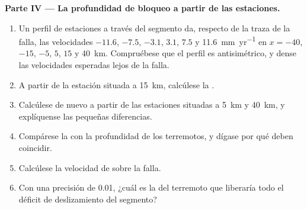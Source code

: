 \begin{problem}
\medskip
\noindent\textbf{Parte IV --- La profundidad de bloqueo a partir de las estaciones.}
\begin{enumerate}[resume]
  \item Un perfil de estaciones a través del segmento da, respecto de la traza de la falla, las velocidades $-11.6$, $-7.5$, $-3.1$, $3.1$,
        $7.5$ y \qty{11.6}{mm.yr^{-1}} en $x = -40$, $-15$, $-5$, $5$, $15$ y \qty{40}{km}. Compruébese que el perfil es antisimétrico, y dense
        las velocidades esperadas lejos de la falla.
  \item A partir de la estación situada a \qty{15}{km}, calcúlese la .
  \item Calcúlese de nuevo a partir de las estaciones situadas a \qty{5}{km} y \qty{40}{km}, y explíquense las pequeñas diferencias.
  \item Compárese la  con la profundidad de los terremotos, y dígase por qué deben coincidir.
  \item Calcúlese la velocidad de  sobre la falla.
  \item Con una precisión de 0.01, ¿cuál es la  del terremoto que liberaría todo el déficit de deslizamiento del segmento?
\end{enumerate}
\end{problem}

